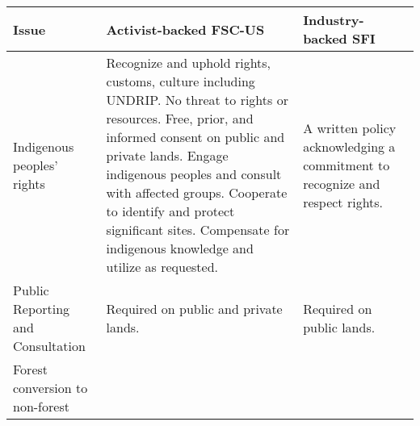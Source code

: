 \begin{table}
\caption{Qualitative levels of performance required for certification}
\label{issues}

\begin{longtable}[]{@{}lll@{}}
\toprule
\begin{minipage}[b]{0.20\columnwidth}\raggedright\strut
Issue\strut
\end{minipage} & \begin{minipage}[b]{0.36\columnwidth}\raggedright\strut
Activist-backed FSC-US\strut
\end{minipage} & \begin{minipage}[b]{0.36\columnwidth}\raggedright\strut
Industry-backed SFI\strut
\end{minipage}\tabularnewline
\midrule
\endhead
\begin{minipage}[t]{0.20\columnwidth}\raggedright\strut
Indigenous peoples' rights\strut
\end{minipage} & \begin{minipage}[t]{0.36\columnwidth}\raggedright\strut
Recognize and uphold rights, customs, culture including UNDRIP. No
threat to rights or resources. Free, prior, and informed consent on
public and private lands. Engage indigenous peoples and consult with
affected groups. Cooperate to identify and protect significant sites.
Compensate for indigenous knowledge and utilize as requested.\strut
\end{minipage} & \begin{minipage}[t]{0.36\columnwidth}\raggedright\strut
A written policy acknowledging a commitment to recognize and respect
rights.\strut
\end{minipage}\tabularnewline
\begin{minipage}[t]{0.20\columnwidth}\raggedright\strut
Public Reporting and Consultation\strut
\end{minipage} & \begin{minipage}[t]{0.36\columnwidth}\raggedright\strut
Required on public and private lands.\strut
\end{minipage} & \begin{minipage}[t]{0.36\columnwidth}\raggedright\strut
Required on public lands.\strut
\end{minipage}\tabularnewline
\begin{minipage}[t]{0.20\columnwidth}\raggedright\strut
Forest conversion to non-forest\strut
\end{minipage} & \begin{minipage}[t]{0.36\columnwidth}\raggedright\strut

\end{minipage}
\end{longtable}
\end{table}
